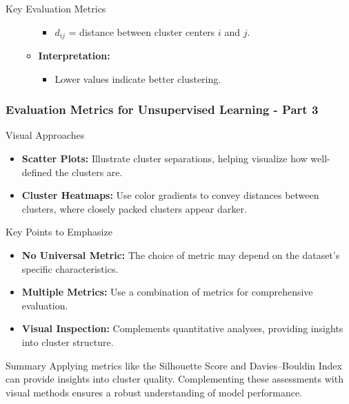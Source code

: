 \documentclass[aspectratio=169]{beamer}
\begin{document}
\begin{frame}[fragile]
\begin{block}{Key Evaluation Metrics}
\begin{enumerate}
\begin{itemize}
\begin{itemize}
                    \item \(d_{ij}\) = distance between cluster centers \(i\) and \(j\).
                \end{itemize}
                \item \textbf{Interpretation:}
                \begin{itemize}
                    \item Lower values indicate better clustering.
                \end{itemize}
            \end{itemize}
        \end{enumerate}
    \end{block}  
\end{frame}

\begin{frame}[fragile]
    \frametitle{Evaluation Metrics for Unsupervised Learning - Part 3}
    \begin{block}{Visual Approaches}
        \begin{itemize}
            \item \textbf{Scatter Plots:} 
            Illustrate cluster separations, helping visualize how well-defined the clusters are.
            \item \textbf{Cluster Heatmaps:} 
            Use color gradients to convey distances between clusters, where closely packed clusters appear darker.
        \end{itemize}
    \end{block}

    \begin{block}{Key Points to Emphasize}
        \begin{itemize}
            \item \textbf{No Universal Metric:} The choice of metric may depend on the dataset's specific characteristics.
            \item \textbf{Multiple Metrics:} Use a combination of metrics for comprehensive evaluation.
            \item \textbf{Visual Inspection:} Complements quantitative analyses, providing insights into cluster structure.
        \end{itemize}
    \end{block}

    \begin{block}{Summary}
        Applying metrics like the Silhouette Score and Davies–Bouldin Index can provide insights into cluster quality. Complementing these assessments with visual methods ensures a robust understanding of model performance.
    \end{block}
\end{frame}
\end{document}
